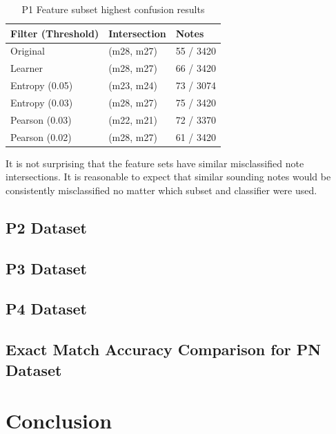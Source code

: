 \documentclass{article}
\begin{document}
\begin{table}[h]
 \begin{center}
  \caption{P1 Feature subset highest confusion results}
\begin{tabular}{|C{2cm}|C{2cm}|C{2cm}|}
      \hline
          Filter (Threshold)& Intersection& Notes \\
         \hline
         Original & (m28, m27)  & 55 / 3420\\
         \hline
         Learner  & (m28, m27)  & 66 / 3420\\
          \hline
         Entropy (0.05) & (m23, m24) &73 / 3074\\
         \hline
         Entropy (0.03)  & (m28, m27)  & 75 / 3420\\
         \hline
         Pearson (0.03) & (m22, m21) & 72 / 3370\\
         \hline
         Pearson (0.02)  & (m28, m27)  & 61 / 3420\\
       \hline
\end{tabular}
\end{center}
 \label{table4}
\end{table}
It is not surprising that the feature sets have similar misclassified note intersections. It is reasonable to expect that similar sounding notes would be consistently misclassified no matter which subset and classifier were used. 


\subsection{P2 Dataset}

\subsection{P3 Dataset}

\subsection{P4 Dataset}

\subsection{Exact Match Accuracy Comparison for PN Dataset}

\section{Conclusion}\label{sec:Conclusion}
\end{document}
